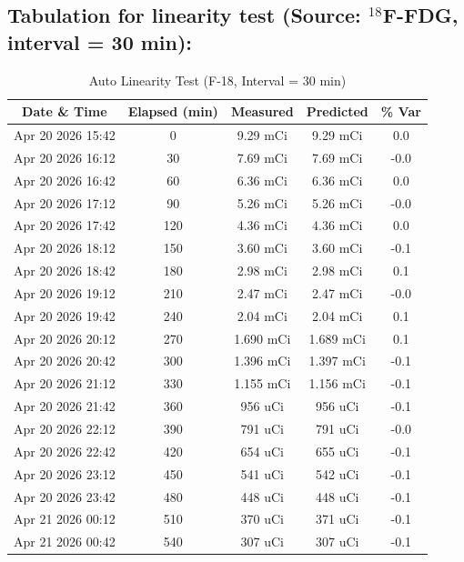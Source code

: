 \subsection{Tabulation for linearity test (Source: $^{18}$F-FDG, interval = 30 min):}

\begin{table}[H]
\centering
\caption{Auto Linearity Test (F-18, Interval = 30 min)}
\begin{tabular}{|c|c|c|c|c|}
\hline
Date \& Time & Elapsed (min) & Measured & Predicted & \% Var \\
\hline
Apr 20 2026 15:42 & 0   & 9.29 mCi  & 9.29 mCi  & 0.0 \\
Apr 20 2026 16:12 & 30  & 7.69 mCi  & 7.69 mCi  & -0.0 \\
Apr 20 2026 16:42 & 60  & 6.36 mCi  & 6.36 mCi  & 0.0 \\
Apr 20 2026 17:12 & 90  & 5.26 mCi  & 5.26 mCi  & -0.0 \\
Apr 20 2026 17:42 & 120 & 4.36 mCi  & 4.36 mCi  & 0.0 \\
Apr 20 2026 18:12 & 150 & 3.60 mCi  & 3.60 mCi  & -0.1 \\
Apr 20 2026 18:42 & 180 & 2.98 mCi  & 2.98 mCi  & 0.1 \\
Apr 20 2026 19:12 & 210 & 2.47 mCi  & 2.47 mCi  & -0.0 \\
Apr 20 2026 19:42 & 240 & 2.04 mCi  & 2.04 mCi  & 0.1 \\
Apr 20 2026 20:12 & 270 & 1.690 mCi & 1.689 mCi & 0.1 \\
Apr 20 2026 20:42 & 300 & 1.396 mCi & 1.397 mCi & -0.1 \\
Apr 20 2026 21:12 & 330 & 1.155 mCi & 1.156 mCi & -0.1 \\
Apr 20 2026 21:42 & 360 & 956 uCi   & 956 uCi   & -0.1 \\
Apr 20 2026 22:12 & 390 & 791 uCi   & 791 uCi   & -0.0 \\
Apr 20 2026 22:42 & 420 & 654 uCi   & 655 uCi   & -0.1 \\
Apr 20 2026 23:12 & 450 & 541 uCi   & 542 uCi   & -0.1 \\
Apr 20 2026 23:42 & 480 & 448 uCi   & 448 uCi   & -0.1 \\
Apr 21 2026 00:12 & 510 & 370 uCi   & 371 uCi   & -0.1 \\
Apr 21 2026 00:42 & 540 & 307 uCi   & 307 uCi   & -0.1 \\

\hline
\end{tabular}
\end{table}

